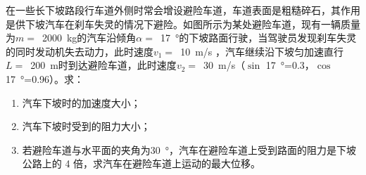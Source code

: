 在一些长下坡路段行车道外侧时常会增设避险车道，车道表面是粗糙碎石，其作用是供下坡汽车在刹车失灵的情况下避险。如图所示为某处避险车道，现有一辆质量为\(m =\) \,\qty{2000}{kg}的汽车沿倾角\(\alpha =\) \,\qty{17}{\degree}的下坡路面行驶，当驾驶员发现刹车失灵的同时发动机失去动力，此时速度\(v_1 =\) \,\qty{10}{m/s}	，汽车继续沿下坡匀加速直行\(L =\) \,\qty{200}{m}时到达避险车道，此时速度\(v_2 =\) \,\qty{30}{m/s}（\(\sin\) \qty{17}{\degree}=0.3，\(\cos\) \qty{17}{\degree}=0.96）。求：
\begin{enumerate}
	\item 汽车下坡时的加速度大小；
	\item 汽车下坡时受到的阻力大小；
	\item 若避险车道与水平面的夹角为\qty{30}{\degree}，汽车在避险车道上受到路面的阻力是下坡公路上的 4 倍，求汽车在避险车道上运动的最大位移。
\end{enumerate}
\begin{answer}
    
\end{answer}